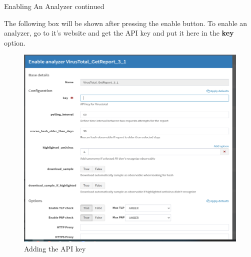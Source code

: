 \begin{frame}{Enabling An Analyzer continued}
\begin{justify}
    The following box will be shown after pressing the enable button. To enable an analyzer, go to it's website and get the API key and put it here in the \textbf{key} option.
\end{justify} 

\begin{figure}[htp]
    \centering
    \includegraphics[scale = 0.35]{enabling an analyzer-2.png}
    \caption{Adding the API key}
    \label{fig:enabling-an-analyzer-2}
\end{figure}
    
\end{frame}

